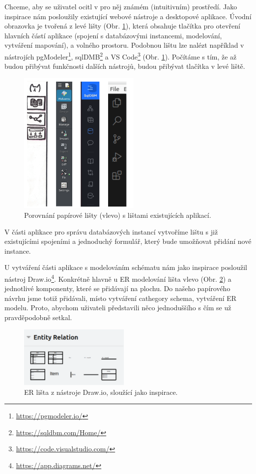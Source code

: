 Chceme, aby se uživatel ocitl v pro něj známém (intuitivním) prostředí. Jako inspirace nám posloužily existující webové nástroje a desktopové aplikace. Úvodní obrazovka je tvořená z levé lišty (Obr. \ref{obr05:listy}), která obsahuje tlačítka pro otevření hlavních částí aplikace (spojení s databázovými instancemi, modelování, vytváření mapování), a volného prostoru. Podobnou lištu lze nalézt například v nástrojích pgModeler\footnote{\url{https://pgmodeler.io/}}, sqlDMB\footnote{\url{https://sqldbm.com/Home/}} a VS Code\footnote{\url{https://code.visualstudio.com/}} (Obr. \ref{obr05:listy}). Počítáme s tím, že až budou přibývat funkčnosti dalších nástrojů, budou přibývat tlačítka v levé liště.

\begin{figure}[htb]
  \centering
  \includegraphics[height=70mm]{../img/listy}
  \caption{Porovnání papírové lišty (vlevo) s lištami existujících aplikací.}
  \label{obr05:listy}
\end{figure}

V části aplikace pro správu databázových instancí vytvoříme lištu s již existujícími spojeními a jednoduchý formulář, který bude umožňovat přidání nové instance.

U vytváření části aplikace s modelováním schématu nám jako inspirace posloužil nástroj Draw.io\footnote{\url{https://app.diagrams.net/}}. Konkrétně hlavně u ER modelování lišta vlevo (Obr. \ref{obr05:er-lista}) a jednotlivé komponenty, které se přidávají na plochu. Do našeho papírového návrhu jsme totiž přidávali, místo vytváření cathegory schema, vytváření ER modelu. Proto, abychom uživateli představili něco jednoduššího s čím se už pravděpodobně setkal. 

\begin{figure}[]
  \centering
  \includegraphics[height=30mm]{../img/er-lista-drawio}
  \caption{ER lišta z nástroje Draw.io, sloužící jako inspirace.}
  \label{obr05:er-lista}
\end{figure}

